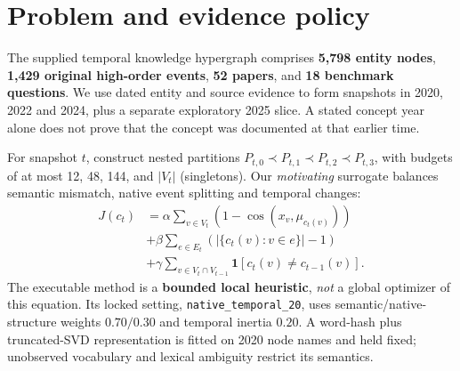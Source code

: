 \documentclass[10pt,twocolumn]{article}
\begin{document}
\section{Problem and evidence policy}
The supplied temporal knowledge hypergraph comprises \textbf{5,798 entity nodes}, \textbf{1,429 original high-order events}, \textbf{52 papers}, and \textbf{18 benchmark questions}. We use dated entity and source evidence to form snapshots in 2020, 2022 and 2024, plus a separate exploratory 2025 slice. A stated concept year alone does not prove that the concept was documented at that earlier time.

For snapshot \(t\), construct nested partitions \(P_{t,0}\prec P_{t,1}\prec P_{t,2}\prec P_{t,3}\), with budgets of at most 12, 48, 144, and \(|V_t|\) (singletons). Our \emph{motivating} surrogate balances semantic mismatch, native event splitting and temporal changes:
\vspace{-1pt}
\begin{align}\nonumber
J(c_t)&=\alpha\sum_{v\in V_t}(1-\cos(x_v,\mu_{c_t(v)}))\\[-3pt]\nonumber
&+\beta\sum_{e\in E_t}(|\{c_t(v):v\in e\}|-1)\\[-3pt]
&+\gamma\sum_{v\in V_t\cap V_{t-1}}\mathbf 1[c_t(v)\ne c_{t-1}(v)].
\end{align}
\vspace{-1pt}
The executable method is a \textbf{bounded local heuristic}, \emph{not} a global optimizer of this equation. Its locked setting, \texttt{native\_temporal\_20}, uses semantic/native-structure weights \(0.70/0.30\) and temporal inertia \(0.20\). A word-hash plus truncated-SVD representation is fitted on 2020 node names and held fixed; unobserved vocabulary and lexical ambiguity restrict its semantics.
\end{document}

